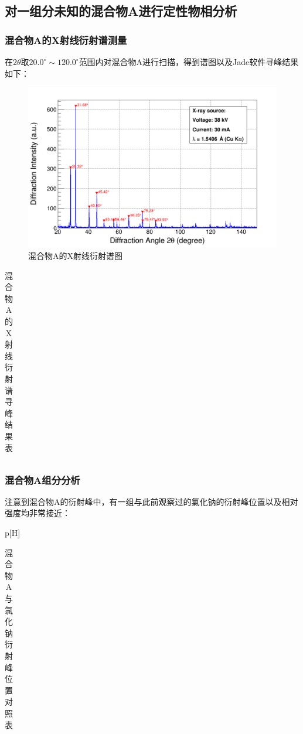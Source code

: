 \documentclass{thuemp}
\begin{document}
\subsection{对一组分未知的混合物A进行定性物相分析}

\subsubsection{混合物A的X射线衍射谱测量}

在$2\theta$取$20.0^\circ \sim 120.0^\circ$范围内对混合物A进行扫描，得到谱图以及Jade软件寻峰结果如下：

\begin{figure}[H]
    \centering
    \includegraphics[width=0.8\linewidth]{../Data/Mixture.png}
    \caption{混合物A的X射线衍射谱图}
    \label{fig:mixture_a_xrd}
\end{figure}

\begin{table}
    \centering
    \captionnamefont{\wuhao\bf\heiti}
    \captiontitlefont{\wuhao\bf\heiti}
    \caption{混合物A的X射线衍射谱寻峰结果表}
    \label{tab:mixture_a_xrd}
    \liuhao
    \begin{tabular}{ccccc}
        \toprule
        \midrule
        \bottomrule
    \end{tabular}
\end{table}

\subsubsection{混合物A组分分析}

注意到混合物A的衍射峰中，有一组与此前观察过的氯化钠的衍射峰位置以及相对强度均非常接近：

\begin{table}p[H]
    \centering
    \captionnamefont{\wuhao\bf\heiti}
    \captiontitlefont{\wuhao\bf\heiti}
    \caption{混合物A与氯化钠衍射峰位置对照表}
    \label{tab:mixture_a_nacl_peaks}
    \liuhao
    \begin{tabular}{ccccc}
        \toprule
        \midrule
        \bottomrule
    \end{tabular}
\end{table}
\end{document}
